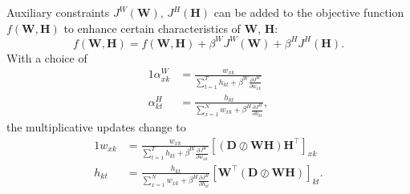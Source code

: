 Auxiliary constraints $J^{W}(\bm{W})$, $J^{H}(\bm{H})$ can be added to the objective function $f(\bm{W,H})$ to enhance certain characteristics of $\bm{W}$, $\bm{H}$:
%
\begin{equation}
	f(\bm{W,H})=f(\bm{W,H})+\beta^{W}J^{W}(\bm{W})+\beta^{H}J^{H}(\bm{H}).
	\label{eq:objective + auxiliary}
\end{equation}
%
With a choice of
%
\begin{alignat}{1}
	\alpha_{xk}^{W} & =\frac{w_{xk}}{\sum_{t=1}^{T}h_{kt}+\beta^{W}\frac{\partial J^{W}}{\partial w_{xk}}}\nonumber \\
	\alpha_{kt}^{H} & =\frac{h_{kt}}{\sum_{x=1}^{N}w_{xk}+\beta^{H}\frac{\partial J^{H}}{\partial h_{kt}}},
	\label{alphas + auxiliary}
\end{alignat}
%
the multiplicative updates change to
%
\begin{alignat}{1}
	w_{xk} & =\frac{w_{xk}}{\sum_{t=1}^{T}h_{kt}+\beta^{W}\frac{\partial J^{W}}{\partial w_{xk}}}\left[(\bm{D}\oslash\bm{WH})\bm{H^{\top}}\right]_{xk}\nonumber \\
	h_{kt} & =\frac{h_{kt}}{\sum_{x=1}^{N}w_{xk}+\beta^{H}\frac{\partial J^{H}}{\partial h_{kt}}}\left[\bm{W^{\top}}(\bm{D}\oslash\bm{WH})\right]_{kt}.
	\label{eq:classic updates + auxiliary}
\end{alignat}